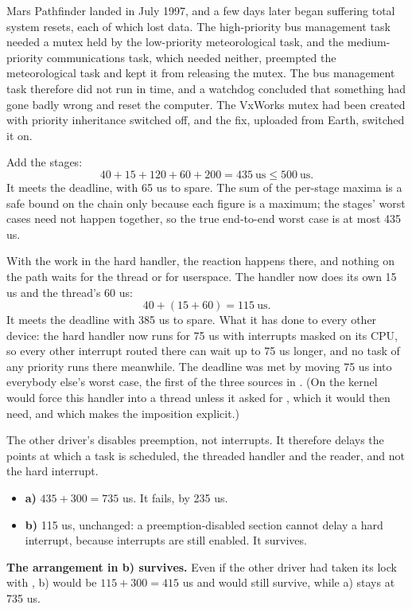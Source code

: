  Mars Pathfinder landed in July 1997, and a few days later began suffering total system
resets, each of which lost data. The high-priority bus management task needed a mutex held by the
low-priority meteorological task, and the medium-priority communications task, which needed
neither, preempted the meteorological task and kept it from releasing the mutex. The bus management
task therefore did not run in time, and a watchdog concluded that something had gone badly wrong
and reset the computer. The VxWorks mutex had been created with priority inheritance switched off,
and the fix, uploaded from Earth, switched it on.


 Add the stages:
\[
  40 + 15 + 120 + 60 + 200 = 435~\text{us} \le 500~\text{us}.
\]
It meets the deadline, with 65 us to spare. The sum of the per-stage maxima is a safe bound on the
chain only because each figure is a maximum; the stages' worst cases need not happen together, so
the true end-to-end worst case is at most 435 us.

 With the work in the hard handler, the reaction happens there, and nothing on the path
waits for the thread or for userspace. The handler now does its own 15 us and the thread's 60 us:
\[
  40 + (15 + 60) = 115~\text{us}.
\]
It meets the deadline with 385 us to spare. What it has done to every other device: the hard
handler now runs for 75 us with interrupts masked on its CPU, so every other interrupt routed there
can wait up to 75 us longer, and no task of any priority runs there meanwhile. The deadline was met
by moving 75 us into everybody else's worst case, the first of the three sources in
. (On  the kernel would force this handler into a thread unless
it asked for , which it would then need, and which makes the imposition
explicit.)

 The other driver's  disables preemption, not interrupts. It therefore
delays the points at which a task is scheduled, the threaded handler and the reader, and not the
hard interrupt.
\begin{itemize}
  \item \textbf{a)} $435 + 300 = 735$ us. It fails, by 235 us.
  \item \textbf{b)} 115 us, unchanged: a preemption-disabled section cannot delay a hard interrupt,
    because interrupts are still enabled. It survives.
\end{itemize}
\textbf{The arrangement in b) survives.} Even if the other driver had taken its lock with
, b) would be $115 + 300 = 415$ us and would still survive, while a) stays
at 735 us.

